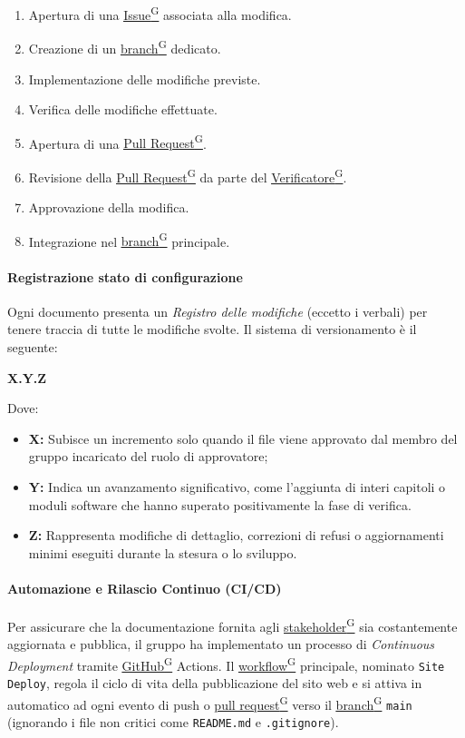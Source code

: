 \documentclass[a4paper,12pt]{article}
\providecommand{\glslink}[2]{\href{https://alittlebyte-19.github.io/Documentazione/glossario.html\#gls-#1}{\underline{#2}\textsuperscript{\scriptsize G}}}
\begin{document}
\begin{enumerate}
    \item Apertura di una \glslink{issue}{Issue} associata alla modifica.
    \item Creazione di un \glslink{branch}{branch} dedicato.
    \item Implementazione delle modifiche previste.
    \item Verifica delle modifiche effettuate.
    \item Apertura di una \glslink{pull-request}{Pull Request}.
    \item Revisione della \glslink{pull-request}{Pull Request} da parte del \glslink{verificatore}{Verificatore}.
    \item Approvazione della modifica.
    \item Integrazione nel \glslink{branch}{branch} principale.
\end{enumerate}

\paragraph{Registrazione stato di configurazione}
Ogni documento presenta un \textit{Registro delle modifiche} (eccetto i verbali) per tenere traccia di tutte le modifiche svolte. Il sistema di versionamento è il seguente: \\

\centerline{\textbf{X.Y.Z}}

Dove: 
\begin{itemize}
    \item \textbf{X:} Subisce un incremento solo quando il file viene approvato dal membro del gruppo incaricato del ruolo di approvatore;
    \item \textbf{Y:} Indica un avanzamento significativo, come l'aggiunta di interi capitoli o moduli software che hanno superato positivamente la fase di verifica.
    \item \textbf{Z:} Rappresenta modifiche di dettaglio, correzioni di refusi o aggiornamenti minimi eseguiti durante la stesura o lo sviluppo.
\end{itemize}

\paragraph{Automazione e Rilascio Continuo (CI/CD)}
Per assicurare che la documentazione fornita agli \glslink{stakeholder}{stakeholder} sia costantemente aggiornata e pubblica, il gruppo ha implementato un processo di \textit{Continuous Deployment} tramite \glslink{github}{GitHub} Actions.
Il \glslink{workflow}{workflow} principale, nominato \texttt{Site Deploy}, regola il ciclo di vita della pubblicazione del sito web e si attiva in automatico ad ogni evento di push o \glslink{pull-request}{pull request} verso il \glslink{branch}{branch} \texttt{main} (ignorando i file non critici come \texttt{README.md} e \texttt{.gitignore}).
\end{document}
